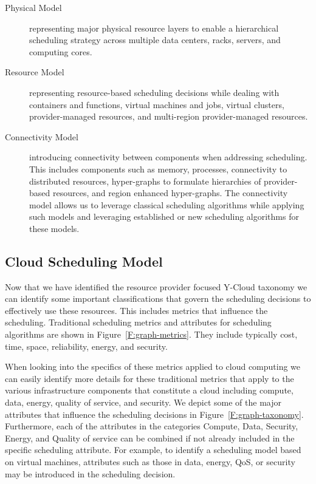 \documentclass[final,5p,times,twocolumn]{elsarticle}
\begin{document}
\begin{description}

\item[Physical Model] representing major physical resource layers to enable a hierarchical scheduling strategy across multiple data centers, racks, servers, and computing cores.

\item[Resource Model] representing resource-based scheduling decisions while dealing with containers and functions, virtual machines and jobs, virtual clusters, provider-managed resources, and multi-region provider-managed resources.

\item[Connectivity Model] introducing connectivity between components when addressing scheduling. This includes components such as memory, processes, connectivity to distributed resources, hyper-graphs to formulate hierarchies of provider-based resources, and region enhanced hyper-graphs. The connectivity model allows us to leverage classical scheduling algorithms while applying such models and leveraging established or new scheduling algorithms for these models.

\end{description}



\subsection{Cloud Scheduling Model}

Now that we have identified the resource provider focused Y-Cloud taxonomy we can identify some important classifications that govern the scheduling decisions to effectively use these resources. This includes metrics that influence the scheduling. Traditional scheduling metrics and attributes for scheduling algorithms are shown in Figure~\ref{F:graph-metrics}. They include typically cost, time, space, reliability, energy, and security.



When looking into the specifics of these metrics applied to cloud computing we can easily identify more details for these traditional metrics that apply to the various infrastructure components that constitute a cloud including compute, data, energy, quality of service, and security. We depict some of the major attributes that influence the scheduling decisions in Figure~\ref{F:graph-taxonomy}. Furthermore, each of the attributes in the categories Compute, Data, Security, Energy, and Quality of service can be combined if not already included in the specific scheduling attribute. For example, to identify a scheduling model based on virtual machines, attributes such as those in data, energy, QoS, or security may be introduced in the scheduling decision.
\end{document}
